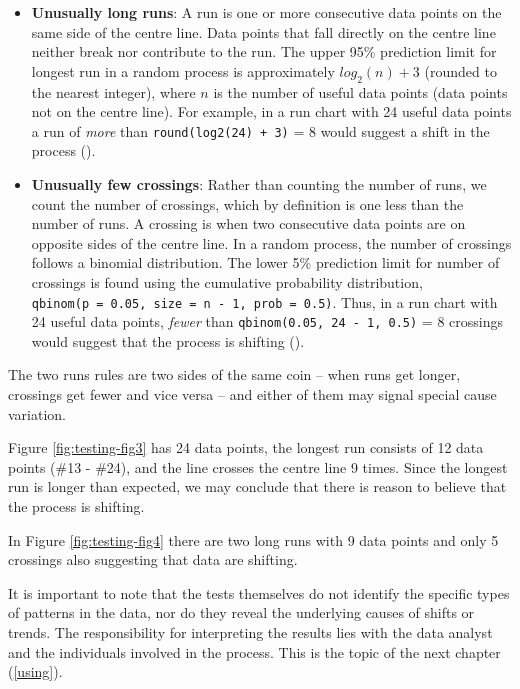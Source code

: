 \documentclass[
]{book}
\begin{document}
\begin{itemize}
\item
  \textbf{Unusually long runs}: A run is one or more consecutive data points on the same side of the centre line. Data points that fall directly on the centre line neither break nor contribute to the run. The upper 95\% prediction limit for longest run in a random process is approximately \(log_2(n)+3\) (rounded to the nearest integer), where \(n\) is the number of useful data points (data points not on the centre line). For example, in a run chart with 24 useful data points a run of \emph{more} than \texttt{round(log2(24)\ +\ 3)} = 8 would suggest a shift in the process ().
\item
  \textbf{Unusually few crossings}: Rather than counting the number of runs, we count the number of crossings, which by definition is one less than the number of runs. A crossing is when two consecutive data points are on opposite sides of the centre line. In a random process, the number of crossings follows a binomial distribution. The lower 5\% prediction limit for number of crossings is found using the cumulative probability distribution, \texttt{qbinom(p\ =\ 0.05,\ size\ =\ n\ -\ 1,\ prob\ =\ 0.5)}. Thus, in a run chart with 24 useful data points, \emph{fewer} than \texttt{qbinom(0.05,\ 24\ -\ 1,\ 0.5)} = 8 crossings would suggest that the process is shifting ().
\end{itemize}

The two runs rules are two sides of the same coin -- when runs get longer, crossings get fewer and vice versa -- and either of them may signal special cause variation.

Figure \ref{fig:testing-fig3} has 24 data points, the longest run consists of 12 data points (\#13 - \#24), and the line crosses the centre line 9 times. Since the longest run is longer than expected, we may conclude that there is reason to believe that the process is shifting.

In Figure \ref{fig:testing-fig4} there are two long runs with 9 data points and only 5 crossings also suggesting that data are shifting.

It is important to note that the tests themselves do not identify the specific types of patterns in the data, nor do they reveal the underlying causes of shifts or trends. The responsibility for interpreting the results lies with the data analyst and the individuals involved in the process. This is the topic of the next chapter (\ref{using}).
\end{document}

